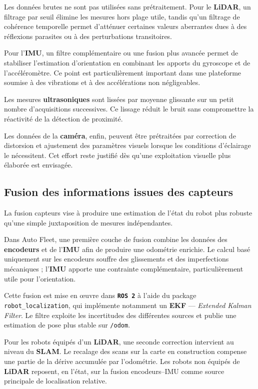 \documentclass[11pt,a4paper]{report}
\newcommand{\kw}[1]{\textbf{#1}}
\newcommand{\outil}[1]{\textbf{\texttt{#1}}}
\begin{document}
Les données brutes ne sont pas utilisées sans prétraitement. Pour le \kw{LiDAR}, un filtrage par seuil élimine les mesures hors plage utile, tandis qu’un filtrage de cohérence temporelle permet d’atténuer certaines valeurs aberrantes dues à des réflexions parasites ou à des perturbations transitoires.

Pour l’\kw{IMU}, un filtre complémentaire ou une fusion plus avancée permet de stabiliser l’estimation d’orientation en combinant les apports du gyroscope et de l’accéléromètre. Ce point est particulièrement important dans une plateforme soumise à des vibrations et à des accélérations non négligeables.

Les mesures \kw{ultrasoniques} sont lissées par moyenne glissante sur un petit nombre d’acquisitions successives. Ce lissage réduit le bruit sans compromettre la réactivité de la détection de proximité.

Les données de la \kw{caméra}, enfin, peuvent être prétraitées par correction de distorsion et ajustement des paramètres visuels lorsque les conditions d’éclairage le nécessitent. Cet effort reste justifié dès qu’une exploitation visuelle plus élaborée est envisagée.

\subsection{Fusion des informations issues des capteurs}

La fusion capteurs vise à produire une estimation de l’état du robot plus robuste qu’une simple juxtaposition de mesures indépendantes.

Dans Auto Fleet, une première couche de fusion combine les données des \kw{encodeurs} et de l’\kw{IMU} afin de produire une odométrie enrichie. Le calcul basé uniquement sur les encodeurs souffre des glissements et des imperfections mécaniques ; l’\kw{IMU} apporte une contrainte complémentaire, particulièrement utile pour l’orientation.

Cette fusion est mise en œuvre dans \outil{ROS 2} à l’aide du package \texttt{robot\_localization}, qui implémente notamment un \kw{EKF} --- \textit{Extended Kalman Filter}. Le filtre exploite les incertitudes des différentes sources et publie une estimation de pose plus stable sur \texttt{/odom}.

Pour les robots équipés d’un \kw{LiDAR}, une seconde correction intervient au niveau du \kw{SLAM}. Le recalage des scans sur la carte en construction compense une partie de la dérive accumulée par l’odométrie. Les robots non équipés de \kw{LiDAR} reposent, en l’état, sur la fusion encodeurs--IMU comme source principale de localisation relative.
\end{document}
